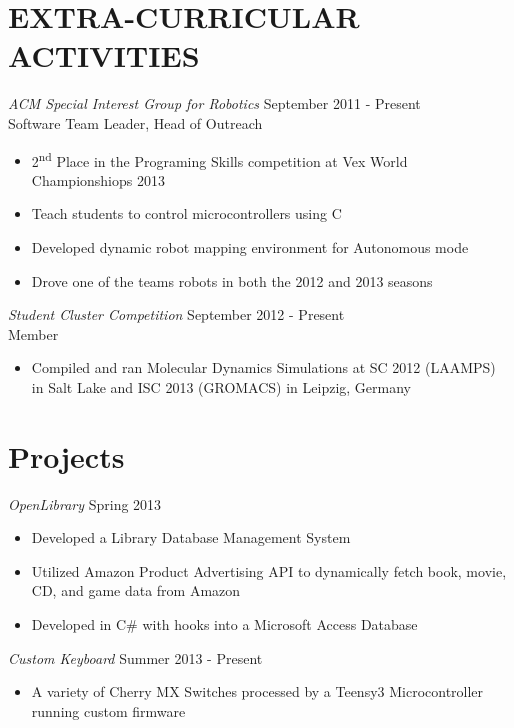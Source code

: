 \documentclass[line,margin]{res}
\begin{document}
\begin{resume}
\section{EXTRA-CURRICULAR \\ ACTIVITIES}
				{\sl ACM Special Interest Group for Robotics} \hfill September 2011 - Present \\
                Software Team Leader, Head of Outreach
                \begin{itemize}  \itemsep -2pt %
                  \item 2\textsuperscript{nd} Place in the Programing Skills competition at Vex World Championshiops 2013
                  \item Teach students to control microcontrollers using C
                  \item Developed dynamic robot mapping environment for Autonomous mode
                  \item Drove one of the teams robots in both the 2012 and 2013 seasons
                \end{itemize}
                
                {\sl Student Cluster Competition} \hfill September 2012 - Present \\
                Member
                \begin{itemize}  \itemsep -2pt %
                  \item Compiled and ran Molecular Dynamics Simulations at SC 2012 (LAAMPS) in Salt Lake and ISC 2013 (GROMACS) in Leipzig, Germany
                \end{itemize}
                
\section{Projects}
				{\sl OpenLibrary} \hfill Spring 2013
                \begin{itemize}  \itemsep -2pt %
                  \item Developed a Library Database Management System
                  \item Utilized Amazon Product Advertising API to dynamically fetch book, movie, CD, and game data from Amazon
                  \item Developed in C\# with hooks into a Microsoft Access Database
                \end{itemize}
                
                {\sl Custom Keyboard} \hfill Summer 2013 - Present
                \begin{itemize}  \itemsep -2pt %
                  \item A variety of Cherry MX Switches processed by a Teensy3 Microcontroller running custom firmware 
                \end{itemize}

\end{resume}
\end{document}
